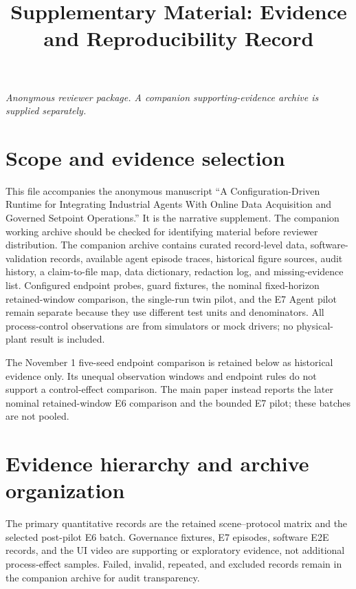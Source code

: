 \documentclass[10pt]{article}
\title{Supplementary Material: Evidence and Reproducibility Record}
\author{}
\date{}
\begin{document}
\maketitle
\noindent\textit{Anonymous reviewer package. A companion supporting-evidence archive is supplied separately.}\par\medskip

\section*{Scope and evidence selection}
This file accompanies the anonymous manuscript ``A Configuration-Driven Runtime for Integrating Industrial Agents With Online Data Acquisition and Governed Setpoint Operations.'' It is the narrative supplement. The companion working archive should be checked for identifying material before reviewer distribution. The companion archive contains curated record-level data, software-validation records, available agent episode traces, historical figure sources, audit history, a claim-to-file map, data dictionary, redaction log, and missing-evidence list. Configured endpoint probes, guard fixtures, the nominal fixed-horizon retained-window comparison, the single-run twin pilot, and the E7 Agent pilot remain separate because they use different test units and denominators. All process-control observations are from simulators or mock drivers; no physical-plant result is included.

The November 1 five-seed endpoint comparison is retained below as historical evidence only. Its unequal observation windows and endpoint rules do not support a control-effect comparison. The main paper instead reports the later nominal retained-window E6 comparison and the bounded E7 pilot; these batches are not pooled.

\section*{Evidence hierarchy and archive organization}
The primary quantitative records are the retained scene--protocol matrix and the selected post-pilot E6 batch. Governance fixtures, E7 episodes, software E2E records, and the UI video are supporting or exploratory evidence, not additional process-effect samples. Failed, invalid, repeated, and excluded records remain in the companion archive for audit transparency.
\end{document}
